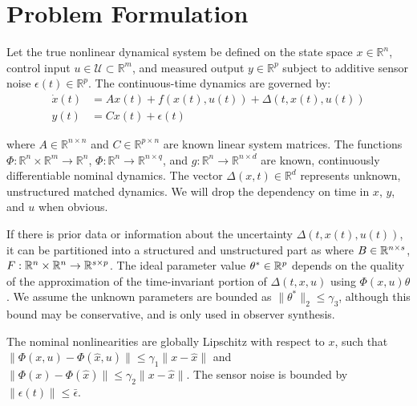 \documentclass[letterpaper, 10 pt, conference]{ieeeconf}  %
\begin{document}
\section{Problem Formulation}

Let the true nonlinear dynamical system be defined on the state space $x \in \mathbb{R}^n$, control input $u \in \mathcal{U} \subset \mathbb{R}^m$, and measured output $y \in \mathbb{R}^p$ subject to additive sensor noise $\epsilon(t) \in \mathbb{R}^p$. The continuous-time dynamics are governed by:
\begin{align}
\dot x(t) &= Ax(t) + f(x(t),u(t)) + \Delta(t,x(t),u(t))\label{eq:system}\\
y(t) &= Cx(t) + \epsilon(t)
\end{align}

where $A \in \mathbb{R}^{n \times n}$ and $C \in \mathbb{R}^{p \times n}$ are known linear system matrices. The functions $\Phi: \mathbb{R}^n \times \mathbb{R}^m \to \mathbb{R}^n$, $\Phi: \mathbb{R}^n \to \mathbb{R}^{n \times q}$, and $g: \mathbb{R}^n \to \mathbb{R}^{n \times d}$ are known, continuously differentiable nominal dynamics. The vector $\Delta(x,t) \in \mathbb{R}^d$ represents unknown, unstructured matched dynamics. We will drop the dependency on time in $x$, $y$, and $u$ when obvious.

If there is prior data or information about the uncertainty $\Delta(t,x(t),u(t))$, it can be partitioned into a structured and unstructured part as  where $B \in \mathbb{R}^{n\times s}$, $F : \mathbb{R}^n \times \mathbb{R}^n \to \mathbb{R}^{s \times p}$. The ideal parameter value $\theta^* \in \mathbb{R}^p$ depends on the quality of the approximation of the time-invariant portion of $\Delta(t,x,u)$ using $\Phi(x,u)\theta$. We assume the unknown parameters are bounded as $\|\theta^*\|_2 \le \gamma_3$, although this bound may be conservative, and is only used in observer synthesis.

\begin{assumption}
The nominal nonlinearities are globally Lipschitz with respect to $x$, such that $\|\Phi(x, u) - \Phi(\hat{x}, u)\| \le \gamma_1 \|x - \hat{x}\|$ and $\|\Phi(x) - \Phi(\hat{x})\| \le \gamma_2 \|x - \hat{x}\|$. The sensor noise is bounded by $\|\epsilon(t)\| \le \bar{\epsilon}$.
\end{assumption}
\end{document}
